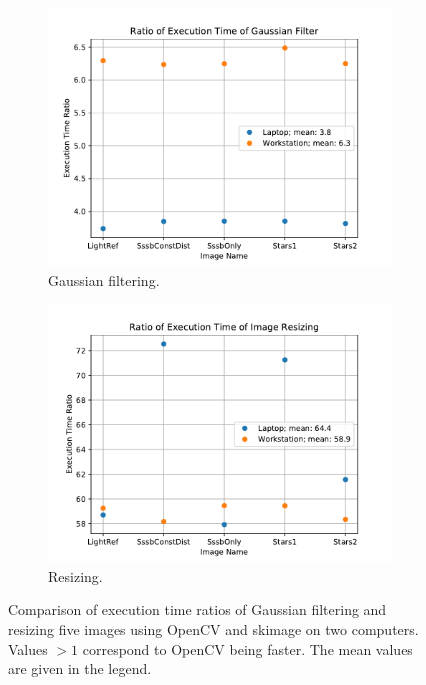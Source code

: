 
\begin{figure}[htb]
    \centering
    \begin{subfigure}[b]{0.47\textwidth}
        \centering
        \includegraphics[width=\textwidth]{doc/thesis/0_figures/cv_skimage/Comparison_Gaussian}
        \caption{Gaussian filtering.}
        \label{fig:bm_comparison_gauss}
    \end{subfigure}
    \begin{subfigure}[b]{0.47\textwidth}
        \centering
        \includegraphics[width=\textwidth]{doc/thesis/0_figures/cv_skimage/Comparison_Resize}
        \caption{Resizing.}
        \label{fig:bm_comparison_res}
    \end{subfigure}
    \caption{Comparison of execution time ratios of Gaussian filtering and resizing five images using OpenCV and \gls{skimage} on two computers. Values $> 1$ correspond to OpenCV being faster. The mean values are given in the legend.}
    \label{fig:bm_comparison}
\end{figure}


